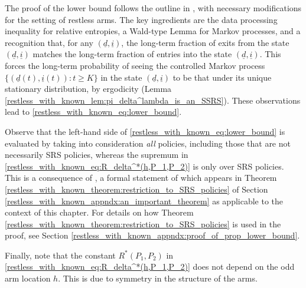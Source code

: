 The proof of the lower bound follows the outline in \cite{Kaufmann2016}, with necessary modifications for the setting of restless arms. The key ingredients are the data processing inequality for relative entropies, a Wald-type Lemma for Markov processes, and a recognition that, for any $(\underline{d},\underline{i})$, the long-term fraction of exits from the state $(\underline{d},\underline{i})$ matches the long-term fraction of entries into the state $(\underline{d},\underline{i})$. This forces the long-term probability of seeing the controlled Markov process $\{(\underline{d}(t), \underline{i}(t)): t\geq K\}$ in the state $(\underline{d},\underline{i})$ to be that under its unique stationary distribution, by ergodicity (Lemma \ref{restless_with_known_lem:pi_delta^lambda_is_an_SSRS}). These observations lead to  \eqref{restless_with_known_eq:lower_bound}.

Observe that the left-hand side of \eqref{restless_with_known_eq:lower_bound} is evaluated by taking into consideration \emph{all} policies, including those that are not necessarily SRS policies, whereas the supremum in \eqref{restless_with_known_eq:R_delta^*(h,P_1,P_2)} is only over SRS policies. This is a consequence of \cite[Theorem 8.8.2]{puterman2014markov}, a formal statement of which appears in Theorem \ref{restless_with_known_theorem:restriction_to_SRS_policies} of Section \ref{restless_with_known_appndx:an_important_theorem} as applicable to the context of this chapter. For details on how Theorem \ref{restless_with_known_theorem:restriction_to_SRS_policies} is used in the proof, see Section \ref{restless_with_known_appndx:proof_of_prop_lower_bound}. 

Finally, note that the constant $R^*(P_1,P_2)$ in \eqref{restless_with_known_eq:R_delta^*(h,P_1,P_2)} does not depend on the odd arm location $h$. This is due to symmetry in the structure of the arms.

